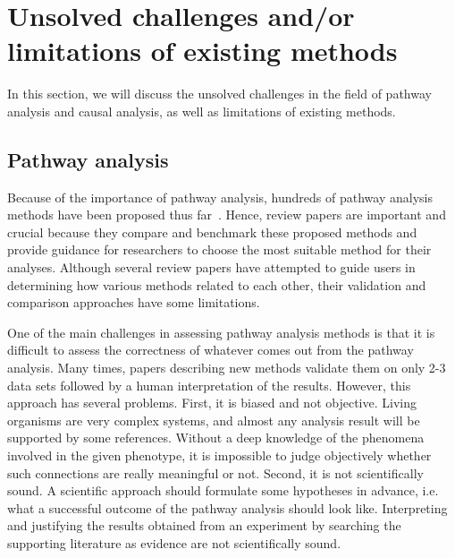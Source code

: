 \documentclass[Minh_PhD_thesis.tex]{subfiles}
\begin{document}

\section{Unsolved challenges and/or limitations of existing methods}
\label{chap:ExisingMethodsLimitation}

In this section, we will discuss the unsolved challenges in the field of pathway analysis and causal analysis, as well as limitations of existing methods.

\subsection{Pathway analysis}

Because of the importance of pathway analysis, hundreds of pathway analysis methods have been proposed thus far~\cite{DraghiciOntologicalToolsReview:2005,Khatri:2002,mitrea2013methods}.
Hence, review papers are important and crucial because they compare and benchmark these proposed methods and provide guidance for researchers to choose the most suitable method for their analyses.
Although several review papers have attempted to guide users in determining how various methods related to each other, their validation and comparison approaches have some limitations.

One of the main challenges in assessing pathway analysis methods is that it is difficult to assess the correctness of whatever comes out from the pathway analysis. Many times, papers describing new methods validate them on only 2-3 data sets followed by a human interpretation of the results.
However, this approach has several problems. First, it is biased and not objective. Living organisms are very complex systems, and almost any  analysis result will be supported by some references. Without a deep knowledge of the phenomena involved in the given phenotype, it is impossible to judge objectively whether such connections are really meaningful or not. Second, it is not scientifically sound. A scientific approach should formulate some hypotheses in advance, i.e. what a successful outcome of the pathway analysis should look like. Interpreting and justifying the results obtained from an experiment by searching the supporting literature as evidence are not scientifically sound.
\end{document}
